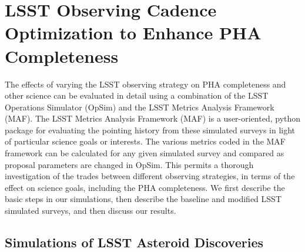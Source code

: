 \section{LSST Observing Cadence Optimization to Enhance PHA Completeness \label{sec:opsim}}

The effects of varying the LSST observing strategy on PHA completeness and other science can be evaluated in detail
using a combination of the LSST Operations Simulator (OpSim) and the LSST Metrics Analysis Framework (MAF).
The LSST Metrics Analysis Framework (MAF) is a user-oriented, python package for evaluating the pointing history
from these simulated surveys in light of particular science goals or interests. The various metrics coded in the
MAF framework can be calculated for any given simulated survey and compared as proposal parameters are changed
in OpSim. This permits a thorough investigation of the trades between different observing strategies, in terms of the
effect on science goals, including the PHA completeness.  We first describe the basic steps in our simulations,
then describe the baseline and modified LSST simulated surveys, and then discuss our results.


\subsection{Simulations of LSST Asteroid Discoveries}

